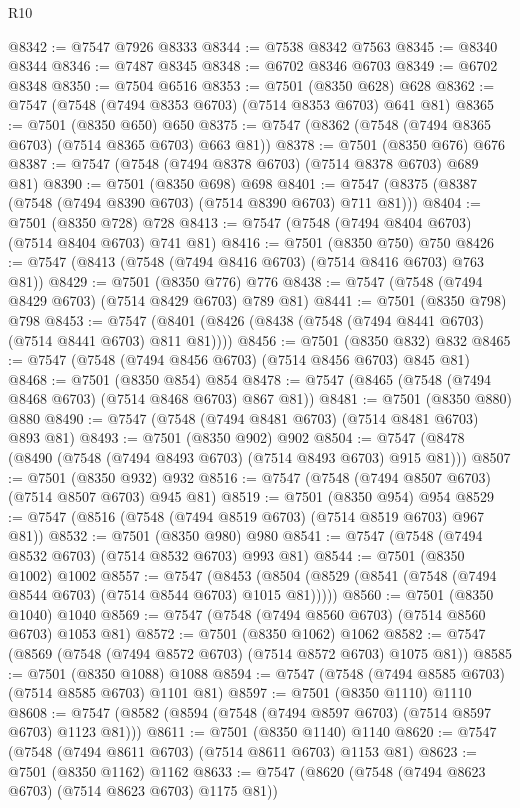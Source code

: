\begin{lexlean}{R10}
\begin{coremodule}
@8342 := @7547 @7926 @8333
@8344 := @7538 @8342 @7563
@8345 := @8340 @8344
@8346 := @7487 @8345
@8348 := @6702 @8346 @6703
@8349 := @6702 @8348
@8350 := @7504 @6516
@8353 := @7501 (@8350 @628) @628
@8362 := @7547 (@7548 (@7494 @8353 @6703) (@7514 @8353 @6703) @641 @81)
@8365 := @7501 (@8350 @650) @650
@8375 := @7547 (@8362 (@7548 (@7494 @8365 @6703) (@7514 @8365 @6703) @663 @81))
@8378 := @7501 (@8350 @676) @676
@8387 := @7547 (@7548 (@7494 @8378 @6703) (@7514 @8378 @6703) @689 @81)
@8390 := @7501 (@8350 @698) @698
@8401 := @7547 (@8375 (@8387 (@7548 (@7494 @8390 @6703) (@7514 @8390 @6703) @711 @81)))
@8404 := @7501 (@8350 @728) @728
@8413 := @7547 (@7548 (@7494 @8404 @6703) (@7514 @8404 @6703) @741 @81)
@8416 := @7501 (@8350 @750) @750
@8426 := @7547 (@8413 (@7548 (@7494 @8416 @6703) (@7514 @8416 @6703) @763 @81))
@8429 := @7501 (@8350 @776) @776
@8438 := @7547 (@7548 (@7494 @8429 @6703) (@7514 @8429 @6703) @789 @81)
@8441 := @7501 (@8350 @798) @798
@8453 := @7547 (@8401 (@8426 (@8438 (@7548 (@7494 @8441 @6703) (@7514 @8441 @6703) @811 @81))))
@8456 := @7501 (@8350 @832) @832
@8465 := @7547 (@7548 (@7494 @8456 @6703) (@7514 @8456 @6703) @845 @81)
@8468 := @7501 (@8350 @854) @854
@8478 := @7547 (@8465 (@7548 (@7494 @8468 @6703) (@7514 @8468 @6703) @867 @81))
@8481 := @7501 (@8350 @880) @880
@8490 := @7547 (@7548 (@7494 @8481 @6703) (@7514 @8481 @6703) @893 @81)
@8493 := @7501 (@8350 @902) @902
@8504 := @7547 (@8478 (@8490 (@7548 (@7494 @8493 @6703) (@7514 @8493 @6703) @915 @81)))
@8507 := @7501 (@8350 @932) @932
@8516 := @7547 (@7548 (@7494 @8507 @6703) (@7514 @8507 @6703) @945 @81)
@8519 := @7501 (@8350 @954) @954
@8529 := @7547 (@8516 (@7548 (@7494 @8519 @6703) (@7514 @8519 @6703) @967 @81))
@8532 := @7501 (@8350 @980) @980
@8541 := @7547 (@7548 (@7494 @8532 @6703) (@7514 @8532 @6703) @993 @81)
@8544 := @7501 (@8350 @1002) @1002
@8557 := @7547
    (@8453 (@8504 (@8529 (@8541 (@7548 (@7494 @8544 @6703) (@7514 @8544 @6703) @1015 @81)))))
@8560 := @7501 (@8350 @1040) @1040
@8569 := @7547 (@7548 (@7494 @8560 @6703) (@7514 @8560 @6703) @1053 @81)
@8572 := @7501 (@8350 @1062) @1062
@8582 := @7547 (@8569 (@7548 (@7494 @8572 @6703) (@7514 @8572 @6703) @1075 @81))
@8585 := @7501 (@8350 @1088) @1088
@8594 := @7547 (@7548 (@7494 @8585 @6703) (@7514 @8585 @6703) @1101 @81)
@8597 := @7501 (@8350 @1110) @1110
@8608 := @7547 (@8582 (@8594 (@7548 (@7494 @8597 @6703) (@7514 @8597 @6703) @1123 @81)))
@8611 := @7501 (@8350 @1140) @1140
@8620 := @7547 (@7548 (@7494 @8611 @6703) (@7514 @8611 @6703) @1153 @81)
@8623 := @7501 (@8350 @1162) @1162
@8633 := @7547 (@8620 (@7548 (@7494 @8623 @6703) (@7514 @8623 @6703) @1175 @81))

\end{coremodule}
\end{lexlean}
